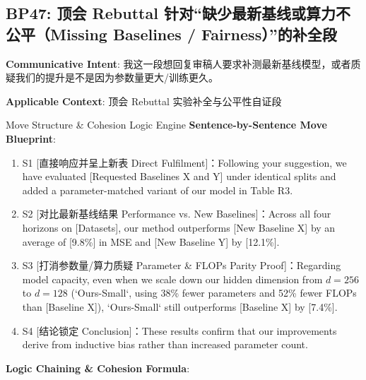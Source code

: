 \subsection{BP47: 顶会 Rebuttal 针对“缺少最新基线或算力不公平（Missing Baselines / Fairness）”的补全段}\label{sec:bp:BP47}
\noindent\textbf{\color{AcadNavy}Communicative Intent}: 我这一段想回复审稿人要求补测最新基线模型，或者质疑我们的提升是不是因为参数量更大/训练更久。\par\vspace{2pt}
\noindent\textbf{\color{AcadSlate}Applicable Context}: 顶会 Rebuttal 实验补全与公平性自证段\par\vspace{4pt}
\begin{ConceptBox}{Move Structure \& Cohesion Logic Engine}
\textbf{Sentence-by-Sentence Move Blueprint}:
\begin{enumerate}[label=\textbf{\color{AcadNavy}S\arabic*.}, leftmargin=2em, itemsep=2pt]
  \item S1 [直接响应并呈上新表 Direct Fulfilment]：Following your suggestion, we have evaluated [Requested Baselines X and Y] under identical splits and added a parameter-matched variant of our model in Table R3.
  \item S2 [对比最新基线结果 Performance vs. New Baselines]：Across all four horizons on [Datasets], our method outperforms [New Baseline X] by an average of [9.8\%] in MSE and [New Baseline Y] by [12.1\%].
  \item S3 [打消参数量/算力质疑 Parameter \& FLOPs Parity Proof]：Regarding model capacity, even when we scale down our hidden dimension from $d=256$ to $d=128$ (`Ours-Small`, using 38\% fewer parameters and 52\% fewer FLOPs than [Baseline X]), `Ours-Small` still outperforms [Baseline X] by [7.4\%].
  \item S4 [结论锁定 Conclusion]：These results confirm that our improvements derive from inductive bias rather than increased parameter count.
\end{enumerate}\par\vspace{4pt}
\textbf{Logic Chaining \& Cohesion Formula}:\par{}
\end{ConceptBox}
